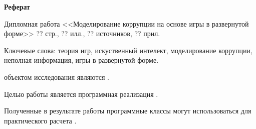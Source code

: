 \begin{center}
	{\large \textbf{Реферат}}
\end{center}
\par
Дипломная работа <<Моделирование коррупции на основе игры в развернутой форме>> ?? стр., ?? илл., ?? источников, ?? прил.
\par
Ключевые слова: теория игр, искуственный интелект, моделирование коррупции, неполная информация, игры в развернутой форме.
\par
объектом исследования являются .
\par
Целью работы является программная реализация .
\par Полученные в результате работы программные классы могут использоваться для практического расчета .